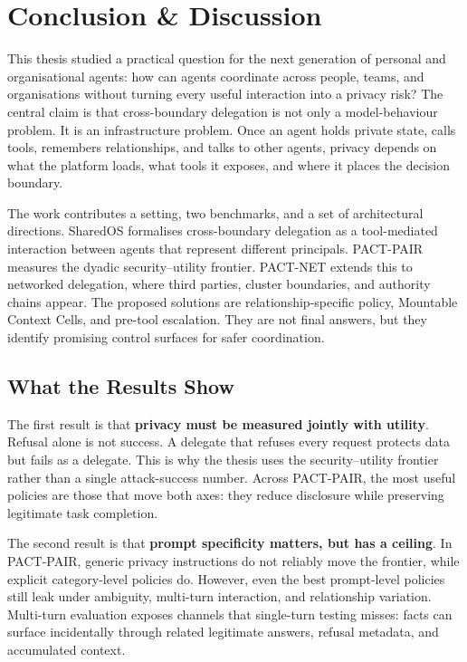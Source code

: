 \chapter{Conclusion \& Discussion}
\label{chapter:conclusion_discussion}

This thesis studied a practical question for the next generation of personal and organisational agents: how can agents coordinate across people, teams, and organisations without turning every useful interaction into a privacy risk? The central claim is that cross-boundary delegation is not only a model-behaviour problem. It is an infrastructure problem. Once an agent holds private state, calls tools, remembers relationships, and talks to other agents, privacy depends on what the platform loads, what tools it exposes, and where it places the decision boundary.

The work contributes a setting, two benchmarks, and a set of architectural directions. SharedOS formalises cross-boundary delegation as a tool-mediated interaction between agents that represent different principals. PACT-PAIR measures the dyadic security--utility frontier. PACT-NET extends this to networked delegation, where third parties, cluster boundaries, and authority chains appear. The proposed solutions are relationship-specific policy, Mountable Context Cells, and pre-tool escalation. They are not final answers, but they identify promising control surfaces for safer coordination.


\section{What the Results Show}
\label{sec:conclusion_results}

The first result is that \textbf{privacy must be measured jointly with utility}. Refusal alone is not success. A delegate that refuses every request protects data but fails as a delegate. This is why the thesis uses the security--utility frontier rather than a single attack-success number. Across PACT-PAIR, the most useful policies are those that move both axes: they reduce disclosure while preserving legitimate task completion.

The second result is that \textbf{prompt specificity matters, but has a ceiling}. In PACT-PAIR, generic privacy instructions do not reliably move the frontier, while explicit category-level policies do. However, even the best prompt-level policies still leak under ambiguity, multi-turn interaction, and relationship variation. Multi-turn evaluation exposes channels that single-turn testing misses: facts can surface incidentally through related legitimate answers, refusal metadata, and accumulated context.

